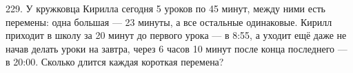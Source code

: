 229. У кружковца Кирилла сегодня 5 уроков по 45 минут, между ними есть перемены: одна большая --- 23 минуты, а все остальные одинаковые. Кирилл приходит в школу за 20 минут до первого урока --- в 8:55, а уходит ещё даже не начав делать уроки на завтра, через 6 часов 10 минут после конца последнего --- в 20:00. Сколько длится каждая короткая перемена?\\
